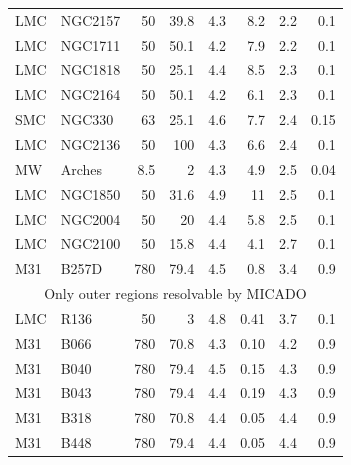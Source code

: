 \documentclass[referee]{aa}
\begin{document}
\begin{appendix}
\begin{table}
\begin{tabular}{l l r r r r r r}
        LMC    & NGC2157      & 50       & 39.8 & 4.3       & 8.2     & 2.2            & 0.1           \\
        LMC    & NGC1711      & 50       & 50.1 & 4.2       & 7.9     & 2.2            & 0.1           \\
        LMC    & NGC1818      & 50       & 25.1 & 4.4       & 8.5     & 2.3            & 0.1           \\
        LMC    & NGC2164      & 50       & 50.1 & 4.2       & 6.1     & 2.3            & 0.1           \\
        SMC    & NGC330       & 63       & 25.1 & 4.6       & 7.7     & 2.4            & 0.15          \\
        LMC    & NGC2136      & 50       & 100  & 4.3       & 6.6     & 2.4            & 0.1           \\
        MW     & Arches       & 8.5      & 2    & 4.3       & 4.9     & 2.5            & 0.04          \\
        LMC    & NGC1850      & 50       & 31.6 & 4.9       & 11      & 2.5            & 0.1           \\
        LMC    & NGC2004      & 50       & 20   & 4.4       & 5.8     & 2.5            & 0.1           \\
        LMC    & NGC2100      & 50       & 15.8 & 4.4       & 4.1     & 2.7            & 0.1           \\
        M31    & B257D        & 780      & 79.4 & 4.5       & 0.8     & 3.4            & 0.9           \\
        \hline
        \multicolumn{8}{c}{Only outer regions resolvable by MICADO}                                    \\
        \hline
        LMC    & R136         & 50       & 3    & 4.8       & 0.41    & 3.7            & 0.1           \\
        M31    & B066         & 780      & 70.8 & 4.3       & 0.10    & 4.2            & 0.9           \\
        M31    & B040         & 780      & 79.4 & 4.5       & 0.15    & 4.3            & 0.9           \\
        M31    & B043         & 780      & 79.4 & 4.4       & 0.19    & 4.3            & 0.9           \\
        M31    & B318         & 780      & 70.8 & 4.4       & 0.05    & 4.4            & 0.9           \\
        M31    & B448         & 780      & 79.4 & 4.4       & 0.05    & 4.4            & 0.9           \\

\end{tabular}
\end{table}
\end{appendix}
\end{document}
